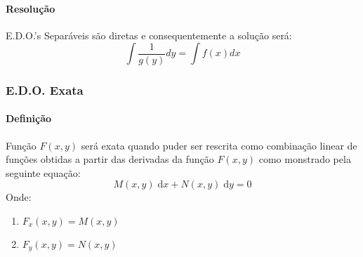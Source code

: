 \documentclass{article}
\begin{document}
                \paragraph{Resolução}E.D.O.'s Separáveis são diretas e consequentemente a solução será:
                    \begin{equation}
                        \boxed{
                            \int{\frac{1}{g(y)}dy} = \int{f(x)dx}
                        }
                    \end{equation}

            \subsubsection{E.D.O. Exata}
                \paragraph{Definição}Função $F(x,y)$ será exata quando puder ser rescrita como combinação linear de funções obtidas a partir das derivadas da função $F(x,y)$ como monstrado pela seguinte equação:
                    \begin{equation}
                        M(x,y)\;\text{d}x + N(x,y)\;\text{d}y = 0
                    \end{equation}
                Onde:
                    \begin{enumerate}[noitemsep]
                        \item $F_{x}(x,y) = M(x,y)$
                        \item $F_{y}(x,y) = N(x,y)$
                    \end{enumerate}
\end{document}
